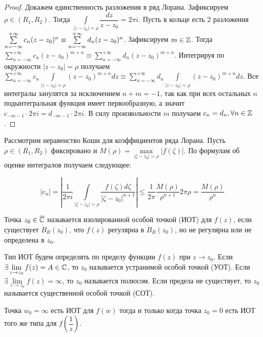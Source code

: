 \begin{proof}
    Докажем единственность разложения в ряд Лорана. Зафиксируем \(\rho \in (R_1, R_2)\). Тогда
    \(\int\limits_{|z-z_0| = \rho} \dfrac{dz}{z-z_0} = 2 \pi i\). Пусть в кольце есть 2 разложения
    \(\sum\limits_{n = -\infty}^{+\infty} c_n (z-z_0)^n \equiv \sum\limits_{n = -\infty}^{+\infty}
    d_n (z\hm-z_0)^n\). Зафиксируем \(m \in \mathbb{Z}\). Тогда \(\sum\limits_{n = -\infty}^{+\infty} c_n
    (z-z_0)^{m+n} \equiv \sum\limits_{n = -\infty}^{+\infty} d_n (z-z_0)^{m+n}\). Интегрируя по
    окружности \(|z-z_0| = \rho\) получаем \(\sum\limits_{n = -\infty}^{+\infty} c_n
    \int\limits_{|z-z_0| = \rho} (z-z_0)^{m+n} dz \equiv \sum\limits_{n = -\infty}^{+\infty} d_n
    \int\limits_{|z-z_0| = \rho}(z-z_0)^{m+n} dz\). Все интегралы занулятся за исключением \(n+m =
    -1\), так как при всех остальных \(n\) подынтегральная функция имеет первообразную, а значит
    \(c_{-m-1} \cdot 2 \pi i = d_{-m-1} \cdot 2 \pi i\). В силу произвольности \(m\) получаем
    \(c_n = d_n, \forall n \in \mathbb{Z}\).
\end{proof}

Рассмотрим неравенство Коши для коэффициентов ряда Лорана. Пусть \(\rho \in (R_1, R_2)\) фиксировано
и \(M(\rho) = \max\limits_{|\zeta - z_0| = \rho} |f(\zeta)|\). По формулам об оценке интегралов
получаем следующее:

\[|c_n| = \left|\dfrac{1}{2 \pi i} \int\limits_{|\zeta - z_0| = \rho} \dfrac{f(\zeta) d\zeta}{|\zeta
- z_0|^{n+1}}\right| \le \dfrac{1}{2 \pi} \dfrac{M(\rho)}{\rho^{n+1}} 2\pi \rho =
\dfrac{M(\rho)}{\rho^{n}}\]



\begin{definition}
    Точка \(z_0 \in \overline{\mathbb{C}}\) называется изолированной особой точкой (ИОТ) для \(f(z)\), если
    существует \(\mathring{B}_R(z_0)\), что \(f(z)\) регулярна в \(\mathring{B}_R(z_0)\), но не
    регулярна или не определена в \(z_0\).
\end{definition}

Тип ИОТ будем определять по пределу функции \(f(z)\) при \(z \rightarrow z_0\). Если \(\exists
\lim\limits_{z \rightarrow z_0} f(z) \hm= A \in \Co\), то \(z_0\) называется устранимой особой
точкой (УОТ). Если \(\exists \lim\limits_{z \rightarrow z_0} f(z) = \infty\), то \(z_0\) называется
полюсом. Если предела не существует, то \(z_0\) называется существенной особой точкой (СОТ).

\begin{statement} \label{23:ISP_of_1/z}
    Точка \(w_0 = \infty\) есть ИОТ для \(f(w)\) тогда и только когда точка \(z_0 = 0\) есть ИОТ
    того же типа для \(f(\dfrac{1}{z})\).
\end{statement}

